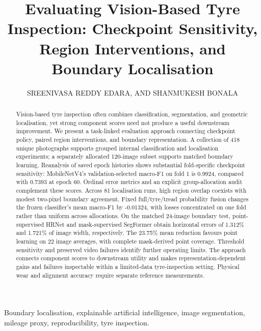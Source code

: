 \documentclass[nolineno]{ieeeaccess}
\begin{document}
\raggedbottom
\pagestyle{headings}
\title{Evaluating Vision-Based Tyre Inspection: Checkpoint Sensitivity, Region Interventions, and Boundary Localisation}
\author{\uppercase{Sreenivasa Reddy Edara}, AND
\uppercase{Shanmukesh Bonala}}
\address[1]{(sreenivasareddy.e@vitap.ac.in) School of Computer Science and Engineering, VIT-AP University, Amaravati, India}
\address[2]{(shanmukesh.23BCE20070@vitapstudent.ac.in) School of Computer Science and Engineering, VIT-AP University, Amaravati, India}
\begin{abstract}
Vision-based tyre inspection often combines classification, segmentation, and geometric localisation, yet strong component scores need not produce a useful downstream improvement. We present a task-linked evaluation approach connecting checkpoint policy, paired region interventions, and boundary representation. A collection of 418 unique photographs supports grouped internal classification and localisation experiments; a separately allocated 120-image subset supports matched boundary learning. Reanalysis of saved epoch histories shows substantial fold-specific checkpoint sensitivity: MobileNetV4's validation-selected macro-F1 on fold 1 is 0.9924, compared with 0.7393 at epoch 60. Ordinal error metrics and an explicit group-allocation audit complement these scores. Across 81 localisation runs, high region overlap coexists with modest two-pixel boundary agreement. Fixed full/tyre/tread probability fusion changes the frozen classifier's mean macro-F1 by -0.01324, with losses concentrated on one fold rather than uniform across allocations. On the matched 24-image boundary test, point-supervised HRNet and mask-supervised SegFormer obtain horizontal errors of 1.312\% and 1.721\% of image width, respectively. The 23.75\% mean reduction favours point learning on 22 image averages, with complete mask-derived point coverage. Threshold sensitivity and preserved video failures identify further operating limits. The approach connects component scores to downstream utility and makes representation-dependent gains and failures inspectable within a limited-data tyre-inspection setting. Physical wear and alignment accuracy require separate reference measurements.
\end{abstract}
\begin{keywords}
Boundary localisation, explainable artificial intelligence, image segmentation, mileage proxy, reproducibility, tyre inspection.
\end{keywords}
\titlepgskip=-21pt
\maketitle





\FloatBarrier



\EOD
\end{document}
